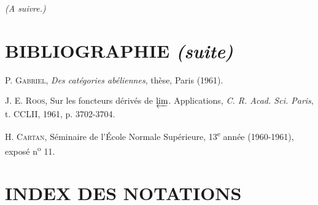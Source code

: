 \begin{flushright}
\emph{(A suivre.)}
\end{flushright}

\clearpage
{}
\thispagestyle{empty}
\null
\clearpage
\thispagestyle{plain}

\section*{BIBLIOGRAPHIE \textit{(suite)}}

\begin{flushleft}
[27] P. \textsc{Gabriel}, \emph{Des catégories abéliennes}, thèse, Paris (1961).

\medskip
[28] J. E. \textsc{Roos}, Sur les foncteurs dérivés de $\varprojlim$.
Applications, \emph{C. R. Acad. Sci. Paris}, t. CCLII, 1961, p. 3702-3704.

\medskip
[29] H. \textsc{Cartan}, Séminaire de l'École Normale Supérieure,
13\textsuperscript{e} année (1960-1961), exposé n\textsuperscript{o} 11.
\end{flushleft}

\clearpage
{}
\section*{INDEX DES NOTATIONS}

